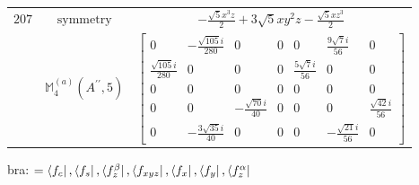 \documentclass[fleqn,8pt,landscape]{jsarticle}
\begin{document}
\begin{longtable}{ccc}
$ 207 $ & $ \text{symmetry} $ & $ - \frac{\sqrt{5} x^{3} z}{2} + 3 \sqrt{5} x y^{2} z - \frac{\sqrt{5} x z^{3}}{2} $ \\
$  $ & $ \mathbb{M}_{4}^{(a)}(A^{\prime\prime},5) $ & $ \begin{bmatrix} 0 & - \frac{\sqrt{105} i}{280} & 0 & 0 & 0 & \frac{9 \sqrt{7} i}{56} & 0 \\ \frac{\sqrt{105} i}{280} & 0 & 0 & 0 & \frac{5 \sqrt{7} i}{56} & 0 & 0 \\ 0 & 0 & 0 & 0 & 0 & 0 & 0 \\ 0 & 0 & - \frac{\sqrt{70} i}{40} & 0 & 0 & 0 & \frac{\sqrt{42} i}{56} \\ 0 & - \frac{3 \sqrt{35} i}{40} & 0 & 0 & 0 & - \frac{\sqrt{21} i}{56} & 0 \end{bmatrix} $ \\ \hline
\end{longtable}
bra: $=\bra{f_{c}}, \bra{f_{s}}, \bra{f_{z}^{\beta}}, \bra{f_{xyz}}, \bra{f_{x}}, \bra{f_{y}}, \bra{f_{z}^{\alpha}}$
\end{document}
